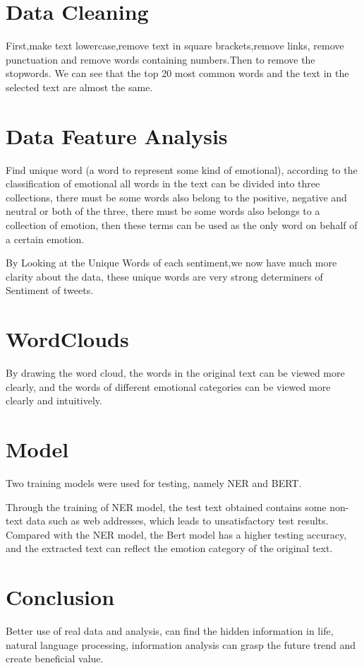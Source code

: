 \section{Data Cleaning} \label{sec-conclusions}
First,make text lowercase,remove text in square brackets,remove links,
remove punctuation and remove words containing numbers.Then to remove the stopwords.
We can see that the top 20 most common words and the text in the selected text are almost the same.

\section{Data Feature Analysis} \label{sec-conclusions}
Find unique word (a word to represent some kind of emotional), 
according to the classification of emotional all words in the text can be divided into three collections, 
there must be some words also belong to the positive, 
negative and neutral or both of the three, 
there must be some words also belongs to a collection of emotion,
then these terms can be used as the only word on behalf of a certain emotion.

By Looking at the Unique Words of each sentiment,we now have much more clarity about the data,
these unique words are very strong determiners of Sentiment of tweets.

\section{WordClouds} \label{sec-conclusions}
By drawing the word cloud, 
the words in the original text can be viewed more clearly, 
and the words of different emotional categories can be viewed more clearly and intuitively.

\section{Model} \label{sec-conclusions}
Two training models were used for testing, namely NER and BERT.

Through the training of NER model, 
the test text obtained contains some non-text data such as web addresses,
 which leads to unsatisfactory test results.
Compared with the NER model,
 the Bert model has a higher testing accuracy, 
 and the extracted text can reflect the emotion category of the original text.

 \section{Conclusion} \label{sec-conclusions}
Better use of real data and analysis, can find the hidden information in life, natural
language processing, information analysis can grasp the future trend and create
beneficial value.